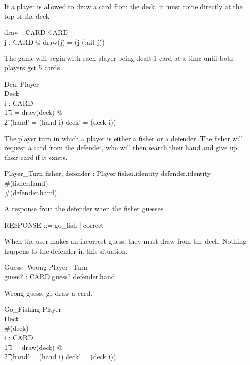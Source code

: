 \documentclass{article}
\begin{document}
If a player is allowed to draw a card from the deck, it must come
directly at the top of the deck.
\begin{axdef}
    draw : \power CARD \fun \power CARD\\
    \where
    \forall j : \power CARD @ draw(j) = (j \setminus (tail~j))
\end{axdef}

The game will begin with each player being dealt 1 card at a time
until both players get 5 cards
\begin{schema}{Deal}
    \Delta Player \\
    \Delta Deck \\
    \where
    \forall i : \power CARD | \\
    \t1 i = draw(deck) @ \\
    \t2 (hand' = (hand \cup i) \land deck' = (deck \setminus i))
\end{schema}

The player turn in which a player is either a fisher
or a defender. The fisher will request a card from the defender,
who will then search their hand and give up their card if it exists.
\begin{schema}{Player\_Turn}
    fisher, defender : Player
    \where
    fisher.identity \neq defender.identity\\
    \#(fisher.hand)  \\
    \#(defender.hand) 
\end{schema}

A response from the defender when the fisher guesses
\begin{zed}
RESPONSE ::= go\_fish | correct
\end{zed}

When the user makes an incorrect guess, they must draw from
the deck. Nothing happens to the defender in this situation.
\begin{schema}{Guess\_Wrong}
    \Xi Player\_Turn \\
    guess? : CARD 
    \where
    guess? \notin defender.hand \\
\end{schema}

Wrong guess, go draw a card.
\begin{schema}{Go\_Fishing}
    \Delta Player\\
    \Delta Deck \\
    \where
    \#(deck)  \\
    \forall i : \power CARD | \\
    \t1 i = draw(deck) @ \\
    \t2 (hand' = (hand \cup i) \land deck' = (deck \setminus i)) \\
\end{schema}
 
\end{document}
